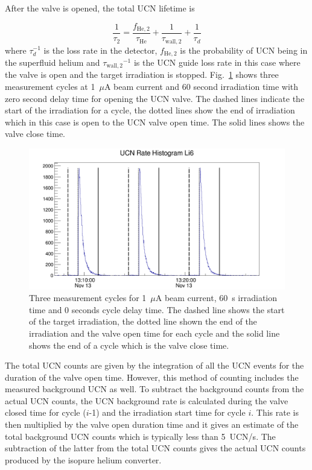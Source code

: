 After the valve is opened, the total UCN lifetime is

\begin{equation}
  \label{eqn:tau2}
  \frac{1}{\tau_2} = \frac{ f_\mathrm{He,2}}{\tau_\mathrm{He}} + \frac{1}{\tau_\mathrm{wall,2}}+\frac{1}{\tau_d}
\end{equation}
where $\tau_d^{-1}$ is the loss rate in the detector,
${ f_\mathrm{He,2}}$ is the probability of UCN being in the superfluid
  helium and ${\tau_\mathrm{wall,2}}^{-1}$ is the UCN guide loss rate
  in this case where the valve is open and the target irradiation is
  stopped. Fig.~\ref{fig:UCNRate_with_lines} shows three measurement
  cycles at 1~$\mu$A beam current and 60 second irradiation time with
  zero second delay time for opening the UCN valve. The dashed lines
  indicate the start of the irradiation for a cycle, the dotted lines
  show the end of irradiation which in this case is open to the UCN
  valve open time. The solid lines shows the valve close time.


\begin{figure}[h!]
  \centering
  \includegraphics[width=1.1\textwidth]{UCNRate_with_lines.png}
  \caption{Three measurement cycles for 1~$\mu$A beam current, 60~s
    irradiation time and 0 seconds cycle delay time. The dashed line
    shows the start of the target irradiation, the dotted line shown
    the end of the irradiation and the valve open time for each cycle
    and the solid line shows the end of a cycle which is the valve
    close time.  }
  \label{fig:UCNRate_with_lines}
\end{figure}

The total UCN counts are given by the integration of all the UCN
events for the duration of the valve open time. However, this method
of counting includes the measured background UCN as well. To subtract
the background counts from the actual UCN counts, the UCN background
rate is calculated during the valve closed time for cycle ($i$-1) and
the irradiation start time for cycle $i$. This rate is then multiplied
by the valve open duration time and it gives an estimate of the total
background UCN counts which is typically less than 5~UCN/s. The
subtraction of the latter from the total UCN counts gives the actual
UCN counts produced by the isopure helium converter.

